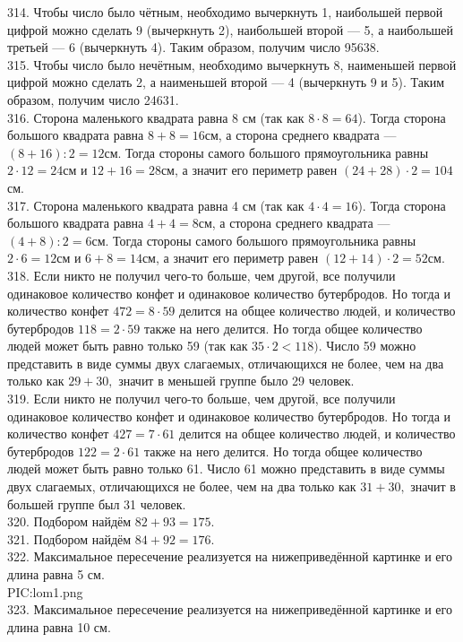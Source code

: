 314. Чтобы число было чётным, необходимо вычеркнуть 1, наибольшей первой цифрой можно сделать 9 (вычеркнуть 2), наибольшей второй --- 5, а наибольшей третьей --- 6 (вычеркнуть 4). Таким образом, получим число 95638.\\
315. Чтобы число было нечётным, необходимо вычеркнуть 8, наименьшей первой цифрой можно сделать 2, а наименьшей второй --- 4 (вычеркнуть 9 и 5). Таким образом, получим число 24631.\\
316. Сторона маленького квадрата равна 8 см (так как $8\cdot8=64$). Тогда сторона большого квадрата равна $8+8=16$см, а сторона среднего квадрата --- $(8+16):2=12$см. Тогда стороны самого большого прямоугольника равны $2\cdot12=24$см и $12+16=28$см, а значит его периметр равен $(24+28)\cdot2=104$см.\\
317. Сторона маленького квадрата равна 4 см (так как $4\cdot4=16$). Тогда сторона большого квадрата равна $4+4=8$см, а сторона среднего квадрата --- $(4+8):2=6$см. Тогда стороны самого большого прямоугольника равны $2\cdot6=12$см и $6+8=14$см, а значит его периметр равен $(12+14)\cdot2=52$см.\\
318. Если никто не получил чего-то больше, чем другой, все получили одинаковое количество конфет и одинаковое количество бутербродов. Но тогда и количество конфет $472=8\cdot59$ делится на общее количество людей, и количество бутербродов $118=2\cdot59$ также на него делится. Но тогда общее количество людей может быть равно только 59 (так как $35\cdot2<118).$ Число 59 можно представить в виде суммы двух слагаемых, отличающихся не более, чем на два только как $29+30,$ значит в меньшей группе было 29 человек.\\
319. Если никто не получил чего-то больше, чем другой, все получили одинаковое количество конфет и одинаковое количество бутербродов. Но тогда и количество конфет $427=7\cdot61$ делится на общее количество людей, и количество бутербродов $122=2\cdot61$ также на него делится. Но тогда общее количество людей может быть равно только 61.  Число 61 можно представить в виде суммы двух слагаемых, отличающихся не более, чем на два только как $31+30,$ значит в большей группе был 31 человек.\\
320. Подбором найдём $82+93=175.$\\
321. Подбором найдём $84+92=176.$\\
322. Максимальное пересечение реализуется на нижеприведённой картинке и его длина равна 5 см.\\
{{PIC:lom1.png}}\\
323. Максимальное пересечение реализуется на нижеприведённой картинке и его длина равна 10 см.\\
